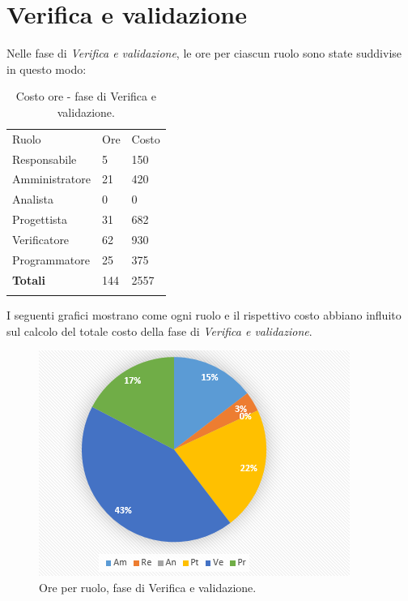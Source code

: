 \documentclass[a4paper]{report}
\begin{document}
		\section{Verifica e validazione}
			Nelle fase di \emph{Verifica e validazione}, le ore per ciascun ruolo sono state suddivise in questo modo:
			\begin{table}[H]
				\begin{tabularx}{\textwidth}{Y Y Y}
					Ruolo & Ore & Costo \\
					Responsabile & 5 & 150 \\
					Amministratore & 21 & 420 \\
					Analista & 0 & 0\\
					Progettista & 31 & 682\\
					Verificatore & 62 & 930\\
					Programmatore & 25 & 375 \\
					\textbf{Totali} & 144 & 2557 \\
				\end{tabularx}
				\caption{Costo ore - fase di Verifica e validazione. } 
				\label{TCVeV}
			\end{table}
			I seguenti grafici mostrano come ogni ruolo e il rispettivo costo abbiano influito sul calcolo del totale 
			costo della fase di \emph{Verifica e validazione}.
			\begin{figure}[H]
				\centering
				\includegraphics[scale=0.7]{PCValidazione}
				\caption{Ore per ruolo, fase di Verifica e validazione.}
			\end{figure}
\end{document}
